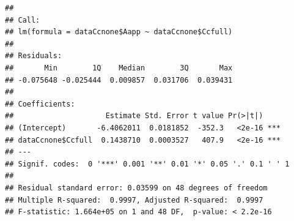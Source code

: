 \documentclass[
]{krantz}
\makeatletter
\newenvironment{Shaded}{\begin{snugshade}}{\end{snugshade}}
\newcommand{\CommentTok}[1]{\textcolor[rgb]{0.56,0.35,0.01}{\textit{#1}}}
\newcommand{\DecValTok}[1]{\textcolor[rgb]{0.00,0.00,0.81}{#1}}
\newcommand{\KeywordTok}[1]{\textcolor[rgb]{0.13,0.29,0.53}{\textbf{#1}}}
\newcommand{\NormalTok}[1]{#1}
\newcommand{\OperatorTok}[1]{\textcolor[rgb]{0.81,0.36,0.00}{\textbf{#1}}}
\newcommand{\StringTok}[1]{\textcolor[rgb]{0.31,0.60,0.02}{#1}}
\newenvironment{kframe}{%
\medskip{}
\setlength{\fboxsep}{.8em}
 \def\at@end@of@kframe{}%
 \ifinner\ifhmode%
  \def\at@end@of@kframe{\end{minipage}}%
  \begin{minipage}{\columnwidth}%
 \fi\fi%
 \def\FrameCommand##1{\hskip\@totalleftmargin \hskip-\fboxsep
 \colorbox{shadecolor}{##1}\hskip-\fboxsep
     \hskip-\linewidth \hskip-\@totalleftmargin \hskip\columnwidth}%
 \MakeFramed {\advance\hsize-\width
   \@totalleftmargin\z@ \linewidth\hsize
   \@setminipage}}%
 {\par\unskip\endMakeFramed%
 \at@end@of@kframe}
\renewenvironment{Shaded}{\begin{kframe}}{\end{kframe}}
\makeatother
\begin{document}
\begin{Shaded}
\end{Shaded}

\begin{verbatim}
## 
## Call:
## lm(formula = dataCcnone$Aapp ~ dataCcnone$Ccfull)
## 
## Residuals:
##       Min        1Q    Median        3Q       Max 
## -0.075648 -0.025444  0.009857  0.031706  0.039431 
## 
## Coefficients:
##                     Estimate Std. Error t value Pr(>|t|)    
## (Intercept)       -6.4062011  0.0181852  -352.3   <2e-16 ***
## dataCcnone$Ccfull  0.1438710  0.0003527   407.9   <2e-16 ***
## ---
## Signif. codes:  0 '***' 0.001 '**' 0.01 '*' 0.05 '.' 0.1 ' ' 1
## 
## Residual standard error: 0.03599 on 48 degrees of freedom
## Multiple R-squared:  0.9997,	Adjusted R-squared:  0.9997 
## F-statistic: 1.664e+05 on 1 and 48 DF,  p-value: < 2.2e-16
\end{verbatim}
\end{document}
